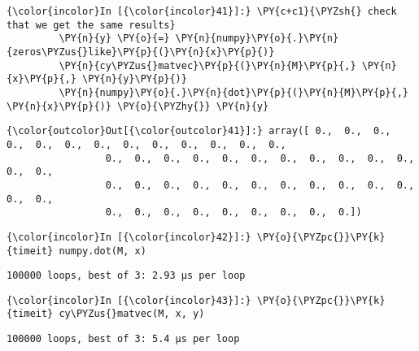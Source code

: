     \begin{Verbatim}[commandchars=\\\{\}]
{\color{incolor}In [{\color{incolor}41}]:} \PY{c+c1}{\PYZsh{} check that we get the same results}
         \PY{n}{y} \PY{o}{=} \PY{n}{numpy}\PY{o}{.}\PY{n}{zeros\PYZus{}like}\PY{p}{(}\PY{n}{x}\PY{p}{)}
         \PY{n}{cy\PYZus{}matvec}\PY{p}{(}\PY{n}{M}\PY{p}{,} \PY{n}{x}\PY{p}{,} \PY{n}{y}\PY{p}{)}
         \PY{n}{numpy}\PY{o}{.}\PY{n}{dot}\PY{p}{(}\PY{n}{M}\PY{p}{,} \PY{n}{x}\PY{p}{)} \PY{o}{\PYZhy{}} \PY{n}{y}
\end{Verbatim}

            \begin{Verbatim}[commandchars=\\\{\}]
{\color{outcolor}Out[{\color{outcolor}41}]:} array([ 0.,  0.,  0.,  0.,  0.,  0.,  0.,  0.,  0.,  0.,  0.,  0.,  0.,
                 0.,  0.,  0.,  0.,  0.,  0.,  0.,  0.,  0.,  0.,  0.,  0.,  0.,
                 0.,  0.,  0.,  0.,  0.,  0.,  0.,  0.,  0.,  0.,  0.,  0.,  0.,
                 0.,  0.,  0.,  0.,  0.,  0.,  0.,  0.,  0.])
\end{Verbatim}
        
    \begin{Verbatim}[commandchars=\\\{\}]
{\color{incolor}In [{\color{incolor}42}]:} \PY{o}{\PYZpc{}}\PY{k}{timeit} numpy.dot(M, x)
\end{Verbatim}

    \begin{Verbatim}[commandchars=\\\{\}]
100000 loops, best of 3: 2.93 µs per loop

    \end{Verbatim}

    \begin{Verbatim}[commandchars=\\\{\}]
{\color{incolor}In [{\color{incolor}43}]:} \PY{o}{\PYZpc{}}\PY{k}{timeit} cy\PYZus{}matvec(M, x, y)
\end{Verbatim}

    \begin{Verbatim}[commandchars=\\\{\}]
100000 loops, best of 3: 5.4 µs per loop

    \end{Verbatim}



